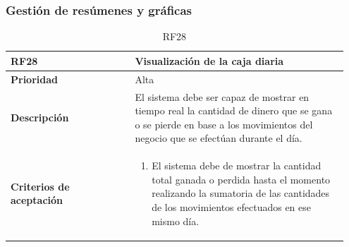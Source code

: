 \subsubsection{Gestión de resúmenes y gráficas}

 \begin{table}[H]
 	\centering %
 	\begin{tabular}{|p{0.35\linewidth}|p{0.6\linewidth}|}
 		\hline
 		\rowcolor{grayshade} \textbf{RF28} & \textbf{Visualización de la caja diaria} \\
 		\hline
 		\textbf{Prioridad} & Alta \\
 		\hline
 		\textbf{Descripción} & El sistema debe ser capaz de mostrar en tiempo real la cantidad de dinero que se gana o se pierde en base a los movimientos del negocio que se efectúan durante el día.\\
 		\hline
 		\vspace{0.5mm}
 		\textbf{Criterios de aceptación} & 
 		\begin{minipage}[t]{0.9\linewidth}
 			\begin{enumerate}
 				\item El sistema debe de mostrar la cantidad total ganada o perdida hasta el momento realizando la sumatoria de las cantidades de los movimientos efectuados en ese mismo día.   
 			\end{enumerate}
 			\vspace{2mm}
 		\end{minipage} \\
 		\hline
 	\end{tabular}
 	\caption{RF28}
 \end{table}


